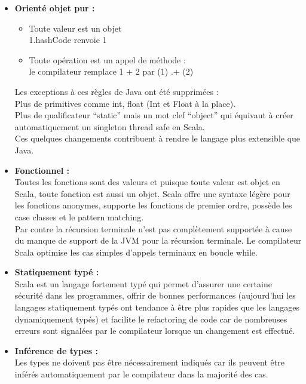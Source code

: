 \begin{itemize}
\item[\textbullet]\textbf{Orienté objet pur :}
  \begin{itemize}
  \item Toute valeur est un objet \\
    1.hashCode renvoie 1
  \item Toute opération est un appel de méthode :\\
    le compilateur remplace 1 + 2 par (1) .+ (2)\\
  \end{itemize}
  Les exceptions à ces règles de Java ont été supprimées :\\
  Plus de primitives comme int, float (Int et Float à la place).\\
  Plus de qualificateur ``static'' mais un mot clef ``object'' qui équivaut à créer
  automatiquement un singleton thread safe en Scala. \\
  Ces quelques changements contribuent à rendre le langage plus extensible
  que Java.\\
\item[\textbullet]\textbf{Fonctionnel :}\\ 
  Toutes les fonctions sont des valeurs et puisque toute valeur est objet en
  Scala, toute fonction est aussi un objet. 
  Scala offre une syntaxe légère pour les fonctions anonymes, supporte les
  fonctions de premier ordre, possède les case classes et le pattern matching.\\
  Par contre la récursion terminale n'est pas complètement supportée à cause du
  manque de support de la JVM pour la récursion terminale. Le compilateur Scala
  optimise les cas simples d'appels terminaux en boucle while.\\
\item[\textbullet]\textbf{Statiquement typé :}\\
  Scala est un langage fortement typé qui permet d'assurer une certaine sécurité
  dans les programmes, offrir de bonnes performances (aujourd'hui les langages
  statiquement typés ont tendance à être plus rapides que les langages
  dynamiquement typés) et facilite le refactoring de code car de nombreuses
  erreurs sont signalées par le compilateur lorsque un changement est effectué.\\
\item[\textbullet]\textbf{Inférence de types :}\\
  Les types ne doivent pas être nécessairement indiqués car ils peuvent être
  inférés automatiquement par le compilateur dans la majorité des cas.\\

\end{itemize}
